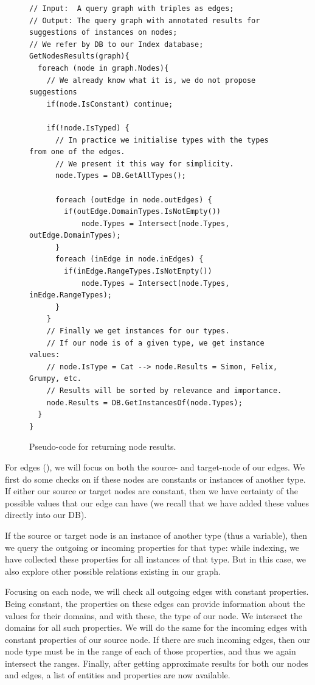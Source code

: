 \begin{example}
\begin{figure}[h]
\begin{verbatim}
// Input:  A query graph with triples as edges;
// Output: The query graph with annotated results for suggestions of instances on nodes;
// We refer by DB to our Index database;
GetNodesResults(graph){
  foreach (node in graph.Nodes){
    // We already know what it is, we do not propose suggestions
    if(node.IsConstant) continue;
        
    if(!node.IsTyped) {
      // In practice we initialise types with the types from one of the edges.
      // We present it this way for simplicity.
      node.Types = DB.GetAllTypes();
      
      foreach (outEdge in node.outEdges) {
        if(outEdge.DomainTypes.IsNotEmpty())
            node.Types = Intersect(node.Types, outEdge.DomainTypes);
      }
      foreach (inEdge in node.inEdges) {
        if(inEdge.RangeTypes.IsNotEmpty())
            node.Types = Intersect(node.Types, inEdge.RangeTypes);
      }
    }
    // Finally we get instances for our types.
    // If our node is of a given type, we get instance values:
    // node.IsType = Cat --> node.Results = Simon, Felix, Grumpy, etc.
    // Results will be sorted by relevance and importance.
    node.Results = DB.GetInstancesOf(node.Types);
  }
}
\end{verbatim}
\caption{Pseudo-code for returning node results.}
\label{fig:codeResultsNodes}
\end{figure}

For edges (), we will focus on both the source- and target-node of our edges. We first do some checks on if these nodes are constants or instances of another type. If either our source or target nodes are constant, then we have certainty of the possible values that our edge can have (we recall that we have added these values directly into our DB).

If the source or target node is an instance of another type (thus a variable), then we query the outgoing or incoming properties for that type: while indexing, we have collected these properties for all instances of that type. But in this case, we also explore other possible relations existing in our graph.

Focusing on each node, we will check all outgoing edges with constant properties. Being constant, the properties on these edges can provide information about the values for their domains, and with these, the type of our node. We intersect the domains for all such properties. We will do the same for the incoming edges with constant properties of our source node. If there are such incoming edges, then our node type must be in the range of each of those properties, and thus we again intersect the ranges. Finally, after getting approximate results for both our nodes and edges, a list of entities and properties are now available. 


\end{example}
